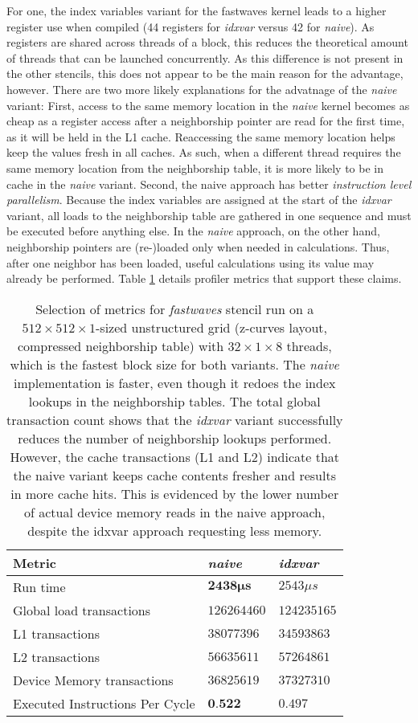 For one, the index variables variant for the fastwaves kernel leads to a higher register use when compiled (44 registers for \emph{idxvar} versus 42 for \emph{naive}). As registers are shared across threads of a block, this reduces the theoretical amount of threads that can be launched concurrently. As this difference is not present in the other stencils, this does not appear to be the main reason for the advantage, however. There are two more likely explanations for the advatnage of the \emph{naive} variant: First, access to the same memory location in the \emph{naive} kernel becomes as cheap as a register access after a neighborship pointer are read for the first time, as it will be held in the L1 cache. Reaccessing the same memory location helps keep the values fresh in all caches. As such, when a different thread requires the same memory location from the neighborship table, it is more likely to be in cache in the \emph{naive} variant. Second, the naive approach has better \emph{instruction level parallelism}. Because the index variables are assigned at the start of the \emph{idxvar} variant, all loads to the neighborship table are gathered in one sequence and must be executed before anything else. In the \emph{naive} approach, on the other hand, neighborship pointers are (re-)loaded only when needed in calculations. Thus, after one neighbor has been loaded, useful calculations using its value may already be performed. Table \ref{tab:fastwaves-naive-idxvar-metrics} details profiler metrics that support these claims.

\begin{table}
	\begin{tabular}{l l l}
		\hline
		Metric & \emph{naive} & \emph{idxvar} \\
		\hline
		Run time & $\mathbf{2438\mu s}$ & $2543\mu s$ \\
		Global load transactions & $126264460$ & $124235165$ \\
		L1 transactions & $38077396$ & $34593863$ \\
		L2 transactions & $56635611$ & $57264861$ \\
		Device Memory transactions & $36825619$ & $37327310$ \\
		Executed Instructions Per Cycle & $\textbf{0.522}$ & $0.497$ \\
		\hline
	\end{tabular}
	\caption{\label{tab:fastwaves-naive-idxvar-metrics}Selection of metrics for \emph{fastwaves} stencil run on a $512\times 512\times 1$-sized unstructured grid (z-curves layout, compressed neighborship table) with $32\times 1\times 8$ threads, which is the fastest block size for both variants. The \emph{naive} implementation is faster, even though it redoes the index lookups in the neighborship tables. The total global transaction count shows that the \emph{idxvar} variant successfully reduces the number of neighborship lookups performed. However, the cache transactions (L1 and L2) indicate that the naive variant keeps cache contents fresher and results in more cache hits. This is evidenced by the lower number of actual device memory reads in the naive approach, despite the idxvar approach requesting less memory.}
\end{table}

